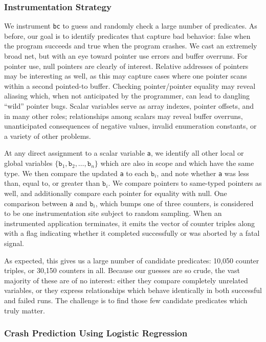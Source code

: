 \subsubsection{Instrumentation Strategy}

We instrument \texttt{bc} to guess and randomly check a large number
of predicates.  As before, our goal is to identify predicates
that capture bad behavior: false when the program succeeds and true
when the program crashes.  We cast an extremely broad net, but with an
eye toward pointer use errors and buffer overruns.  For pointer use,
null pointers are clearly of interest.  Relative addresses of pointers
may be interesting as well, as this may capture cases where one
pointer scans within a second pointed-to buffer.  Checking
pointer/pointer equality may reveal aliasing which, when not
anticipated by the programmer, can lead to dangling ``wild'' pointer
bugs.  Scalar variables serve as array indexes, pointer offsets, and
in many other roles; relationships among scalars may reveal buffer
overruns, unanticipated consequences of negative values, invalid
enumeration constants, or a variety of other problems.

At any direct assignment to a scalar variable \texttt{a}, we identify
all other local or global variables $\{ \mathtt{b}_1, \mathtt{b}_2,
\dots, \mathtt{b}_n \}$ which are also in scope and which have the
same type.  We then compare the updated \texttt{a} to each
$\mathtt{b}_i$, and note whether \texttt{a} was less than, equal to,
or greater than $\mathtt{b}_i$.  We compare pointers to same-typed
pointers as well, and additionally compare each pointer for equality
with null.  One comparison between \texttt{a} and $\mathtt{b}_i$,
which bumps one of three counters, is considered to be one
instrumentation site subject to random sampling.  When an instrumented
application terminates, it emits the vector of counter triples along
with a flag indicating whether it completed successfully or was
aborted by a fatal signal.

As expected, this gives us a large number of candidate predicates:
10,050 counter triples, or 30,150 counters in all.  Because our
guesses are so crude, the vast majority of these are of no interest:
either they compare completely unrelated variables, or they express
relationships which behave identically in both successful and failed
runs.  The challenge is to find those few candidate predicates which
truly matter.

\subsubsection{Crash Prediction Using Logistic Regression}

